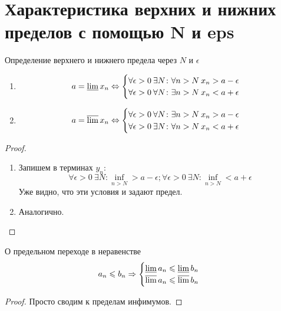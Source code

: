 ﻿\section{Характеристика верхних и нижних пределов с помощью N и eps}
\begin{theorem}{Определение верхнего и нижнего предела через $N$ и $\epsilon$}
\begin{enumerate}
\item $$a = \varliminf x_n \Leftrightarrow \begin{cases}\forall \epsilon > 0\: \exists N\colon \forall n>N\: x_n > a - \epsilon \\ \forall \epsilon > 0\: \forall N\colon \exists n>N\: x_n < a + \epsilon\end{cases}$$
\item $$a = \varlimsup x_n \Leftrightarrow \begin{cases}\forall \epsilon > 0\: \forall N\colon \exists n>N\: x_n > a - \epsilon \\ \forall \epsilon > 0\: \exists N\colon \forall n>N\: x_n < a + \epsilon\end{cases}$$
\end{enumerate}
\end{theorem}
\begin{proof}
\begin{enumerate}
\item Запишем в терминах $y_n$:
$$\forall \epsilon > 0\: \exists N\colon \inf_{n>N} > a-\epsilon ; \forall \epsilon > 0\: \exists N\colon \inf_{n>N} < a+\epsilon$$
Уже видно, что эти условия и задают предел.
\item Аналогично.
\end{enumerate}
\end{proof}

\begin{theorem}{О предельном переходе в неравенстве}
$$a_n \leqslant b_n \Rightarrow \begin{cases}\varliminf a_n \leqslant \varliminf b_n \\ \varlimsup a_n \leqslant \varlimsup b_n\end{cases}$$
\end{theorem}                                                                                                                       
\begin{proof}
Просто сводим к пределам инфимумов. 
\end{proof}
